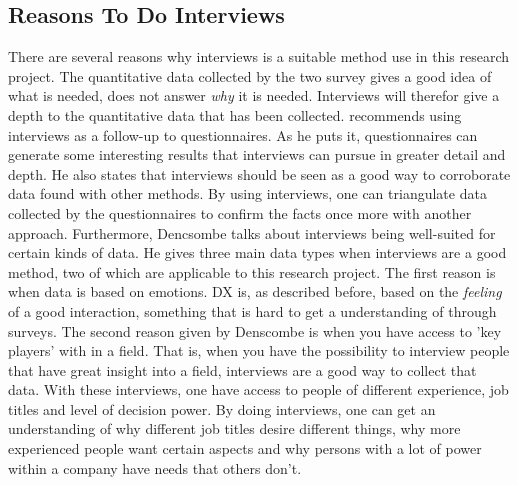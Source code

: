\documentclass{cslthse-msc}
\begin{document}
    \subsection{Reasons To Do Interviews}
    There are several reasons why interviews is a suitable method use in this research project.
    The quantitative data collected
    by the two survey gives a good idea of what is needed, does not answer \textit{why} it is needed.
    Interviews will therefor give a depth to the quantitative data that has been collected.
    \citet{denscombe} recommends using interviews as a follow-up to questionnaires. As he puts it,
    questionnaires can generate some interesting results that interviews can pursue
    in greater detail and depth. He also states that interviews should be seen as a good way
    to corroborate data found with other methods. By using interviews, one can triangulate data
    collected by the questionnaires to confirm the facts once more with another approach.
    Furthermore, Dencsombe talks about interviews being well-suited for certain kinds of data.
    He gives three main data types when interviews are a good method,
    two of which are applicable to this research project. The first reason is
    when data is based on emotions. DX is, as described before, based on the \textit{feeling}
    of a good interaction, something that is hard to get a understanding of through
    surveys. The second reason given by Denscombe is when you have access to 'key players'
    with in a field. That is, when you have the possibility to interview people
    that have great insight into a field, interviews are a good way to collect that data.
    With these interviews, one have access to people of different experience, job titles
    and level of decision power. By doing interviews, one can get an understanding
    of why different job titles desire different things, why more experienced people
    want certain aspects and why persons with a lot of power within a company
    have needs that others don't.
\end{document}
